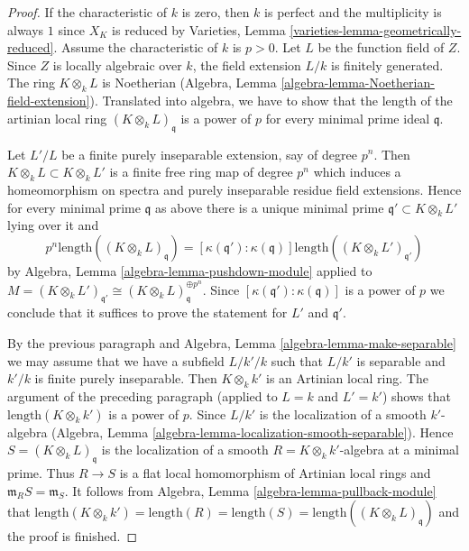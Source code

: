 \documentclass{stacks-project}
\theoremstyle{plain}
\theoremstyle{definition}
\theoremstyle{remark}
\numberwithin{equation}{subsection}
\begin{document}
\begin{proof}
If the characteristic of $k$ is zero, then $k$ is perfect and
the multiplicity is always $1$ since $X_K$ is reduced by
Varieties, Lemma \ref{varieties-lemma-geometrically-reduced}.
Assume the characteristic of $k$ is $p > 0$.
Let $L$ be the function field of $Z$. Since $Z$ is locally algebraic
over $k$, the field extension $L/k$ is finitely generated.
The ring $K \otimes_k L$ is Noetherian
(Algebra, Lemma \ref{algebra-lemma-Noetherian-field-extension}).
Translated into algebra, we have to show that the length of the
artinian local ring $(K \otimes_k L)_\mathfrak q$
is a power of $p$ for every minimal prime ideal $\mathfrak q$.

\medskip\noindent
Let $L'/L$ be a finite purely inseparable extension, say of degree
$p^n$. Then $K \otimes_k L \subset K \otimes_k L'$ is a finite
free ring map of degree $p^n$ which induces a homeomorphism on
spectra and purely inseparable residue field extensions.
Hence for every minimal prime $\mathfrak q$ as above
there is a unique minimal prime
$\mathfrak q' \subset K \otimes_k L'$ lying over it and
$$
p^n \text{length}((K \otimes_k L)_\mathfrak q) =
[\kappa(\mathfrak q') : \kappa(\mathfrak q)]
\text{length}((K \otimes_k L')_{\mathfrak q'})
$$
by Algebra, Lemma \ref{algebra-lemma-pushdown-module} applied
to $M = (K \otimes_k L')_{\mathfrak q'} \cong
(K \otimes_k L)_{\mathfrak q}^{\oplus p^n}$.
Since $[\kappa(\mathfrak q') : \kappa(\mathfrak q)]$ is a power
of $p$ we conclude that it suffices to prove the
statement for $L'$ and $\mathfrak q'$.

\medskip\noindent
By the previous paragraph and Algebra, Lemma \ref{algebra-lemma-make-separable}
we may assume that we have a subfield $L/k'/k$ such that $L/k'$ is separable
and $k'/k$ is finite purely inseparable. Then $K \otimes_k k'$ is an
Artinian local ring. The argument of the preceding paragraph
(applied to $L = k$ and $L' = k'$) shows that $\text{length}(K \otimes_k k')$
is a power of $p$. Since $L/k'$ is the localization of a
smooth $k'$-algebra
(Algebra, Lemma \ref{algebra-lemma-localization-smooth-separable}).
Hence $S = (K \otimes_k L)_\mathfrak q$ is the localization of a smooth
$R = K \otimes_k k'$-algebra at a minimal prime.
Thus $R \to S$ is a flat local homomorphism of Artinian
local rings and $\mathfrak m_R S = \mathfrak m_S$. It
follows from Algebra, Lemma \ref{algebra-lemma-pullback-module} that
$\text{length}(K \otimes_k k') = \text{length}(R) =
\text{length}(S) = \text{length}((K \otimes_k L)_\mathfrak q)$
and the proof is finished.
\end{proof}
\end{document}
